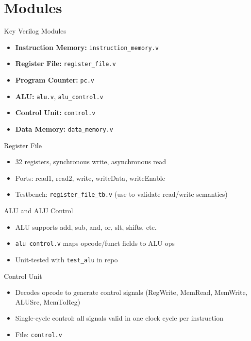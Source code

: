 \documentclass[aspectratio=169]{beamer}
\begin{document}
\section{Modules}
\begin{frame}{Key Verilog Modules}
  \begin{itemize}
    \item \textbf{Instruction Memory:} \texttt{instruction\_memory.v}
    \item \textbf{Register File:} \texttt{register\_file.v}
    \item \textbf{Program Counter:} \texttt{pc.v}
    \item \textbf{ALU:} \texttt{alu.v}, \texttt{alu\_control.v}
    \item \textbf{Control Unit:} \texttt{control.v}
    \item \textbf{Data Memory:} \texttt{data\_memory.v}
  \end{itemize}
  \vspace{0.5em}
\end{frame}

\begin{frame}{Register File}
  \begin{itemize}
    \item 32 registers, synchronous write, asynchronous read
    \item Ports: read1, read2, write, writeData, writeEnable
    \item Testbench: \texttt{register\_file\_tb.v} (use to validate read/write semantics)
  \end{itemize}
\end{frame}

\begin{frame}{ALU and ALU Control}
  \begin{itemize}
    \item ALU supports add, sub, and, or, slt, shifts, etc.
    \item \texttt{alu\_control.v} maps opcode/funct fields to ALU ops
    \item Unit-tested with \texttt{test\_alu} in repo
  \end{itemize}
\end{frame}

\begin{frame}{Control Unit}
  \begin{itemize}
    \item Decodes opcode to generate control signals (RegWrite, MemRead, MemWrite, ALUSrc, MemToReg)
    \item Single-cycle control: all signals valid in one clock cycle per instruction
    \item File: \texttt{control.v}
  \end{itemize}
\end{frame}
\end{document}
